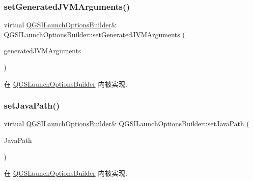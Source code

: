 \subsubsection{\texorpdfstring{set\+Generated\+J\+V\+M\+Arguments()}{setGeneratedJVMArguments()}}
{\footnotesize\ttfamily virtual \mbox{\hyperlink{class_q_g_s_i_launch_options_builder}{Q\+G\+S\+I\+Launch\+Options\+Builder}}\& Q\+G\+S\+I\+Launch\+Options\+Builder\+::set\+Generated\+J\+V\+M\+Arguments (\begin{DoxyParamCaption}\item[{const bool}]{generated\+J\+V\+M\+Arguments }\end{DoxyParamCaption})\hspace{0.3cm}{\ttfamily [pure virtual]}}



在 \mbox{\hyperlink{class_q_g_s_launch_options_builder_ab87202926fbd5ed59b72007963e3ea58}{Q\+G\+S\+Launch\+Options\+Builder}} 内被实现.

\mbox{\label{class_q_g_s_i_launch_options_builder_a45ab3737e587d9d7e01af6f635c815b9}} 
\subsubsection{\texorpdfstring{set\+Java\+Path()}{setJavaPath()}}
{\footnotesize\ttfamily virtual \mbox{\hyperlink{class_q_g_s_i_launch_options_builder}{Q\+G\+S\+I\+Launch\+Options\+Builder}}\& Q\+G\+S\+I\+Launch\+Options\+Builder\+::set\+Java\+Path (\begin{DoxyParamCaption}\item[{const Q\+String \&}]{Java\+Path }\end{DoxyParamCaption})\hspace{0.3cm}{\ttfamily [pure virtual]}}



在 \mbox{\hyperlink{class_q_g_s_launch_options_builder_a4bfe1a9c72306f54ea25120cd605d090}{Q\+G\+S\+Launch\+Options\+Builder}} 内被实现.

\mbox{\label{class_q_g_s_i_launch_options_builder_a4739acc4ebefaac2e41a9ee7264913a1}} 
